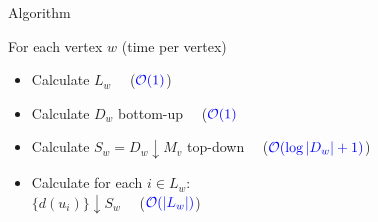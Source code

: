 \documentclass[18pt]{beamer}
\begin{document}
\begin{frame}{Algorithm}
    \begin{minipage}[t]{0.49\textwidth}
    	
    	For each vertex $w$ (time per vertex)
    	\begin{itemize}
    		\item Calculate $L_w$   \ \ ($\color{blue}\mathcal{O}(1)$)
    		\item Calculate $D_w$ bottom-up \ \ ($\color{blue}\mathcal{O}(1)$
    		\item Calculate $S_w = D_w \downarrow M_v$ top-down  \ \ ($\color{blue}\mathcal{O}(\log|D_w| + 1)$)
    		\item Calculate for each $i \in L_w$: \\
    			  $\{d(u_i)\} \downarrow S_w$ \ \ ($\color{blue} \mathcal{O}(|L_w|)$)
    		

\end{itemize}
\end{minipage}
\end{frame}
\end{document}
